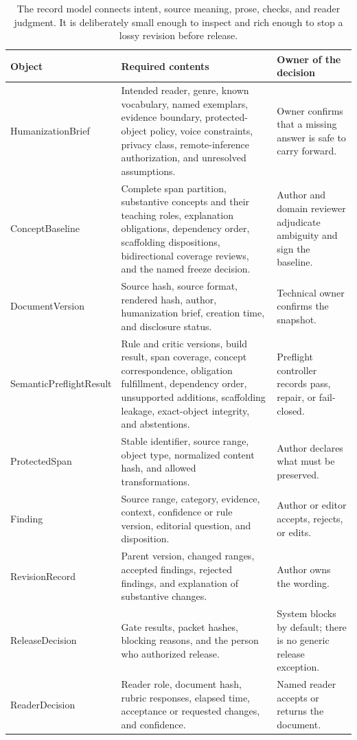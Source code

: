 \begin{table}[H]
\centering
\small
\begin{tabularx}{\textwidth}{@{}p{}L p{0.25\textwidth}@{}}
\toprule
Object & Required contents & Owner of the decision \\
\midrule
HumanizationBrief & Intended reader, genre, known vocabulary, named exemplars,
evidence boundary, protected-object policy, voice constraints, privacy class,
remote-inference authorization, and unresolved assumptions. & Owner confirms that
a missing answer is safe to carry forward. \\
ConceptBaseline & Complete span partition, substantive concepts and their
teaching roles, explanation obligations, dependency order, scaffolding
dispositions, bidirectional coverage reviews, and the named freeze decision. &
Author and domain reviewer adjudicate ambiguity and sign the baseline. \\
DocumentVersion & Source hash, source format, rendered hash, author,
humanization brief, creation time, and disclosure status. & Technical owner
confirms the snapshot. \\
SemanticPreflightResult & Rule and critic versions, build result, span coverage,
concept correspondence, obligation fulfillment, dependency order, unsupported
additions, scaffolding leakage, exact-object integrity, and abstentions. &
Preflight controller records pass, repair, or fail-closed. \\
ProtectedSpan & Stable identifier, source range, object type, normalized
content hash, and allowed transformations. & Author declares what must be
preserved. \\
Finding & Source range, category, evidence, context, confidence or rule
version, editorial question, and disposition. & Author or editor accepts,
rejects, or edits. \\
RevisionRecord & Parent version, changed ranges, accepted findings, rejected
findings, and explanation of substantive changes. & Author owns the wording. \\
ReleaseDecision & Gate results, packet hashes, blocking reasons, and the person
who authorized release. & System blocks by default; there is no generic release
exception. \\
ReaderDecision & Reader role, document hash, rubric responses, elapsed time,
acceptance or requested changes, and confidence. & Named reader accepts or
returns the document. \\
\bottomrule
\end{tabularx}
\caption{The record model connects intent, source meaning, prose, checks, and
reader judgment. It is deliberately small enough to inspect and rich enough to
stop a lossy revision before release.}
\label{tab:record-model}
\end{table}

